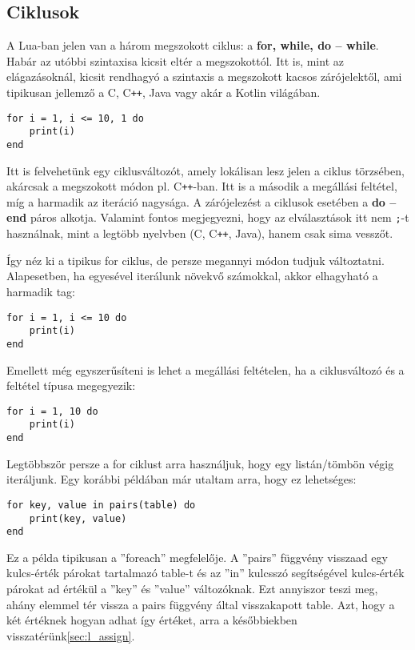 \subsection{Ciklusok}
\label{subsec:l_loop}

A Lua-ban jelen van a három megszokott ciklus: a \textbf{for, while, do -- while}. Habár az utóbbi szintaxisa kicsit eltér a megszokottól. Itt is, mint az elágazásoknál, kicsit rendhagyó a szintaxis a megszokott kacsos zárójelektől, ami tipikusan jellemző a C, C\verb|++|, Java vagy akár a Kotlin világában.
\scriptsize
\begin{lstlisting}
for i = 1, i <= 10, 1 do
	print(i)
end
\end{lstlisting}
\normalsize
Itt is felvehetünk egy ciklusváltozót, amely lokálisan lesz jelen a ciklus törzsében, akárcsak a megszokott módon pl. C\verb|++|-ban. Itt is a második a megállási feltétel, míg a harmadik az iteráció nagysága. A zárójelezést a ciklusok esetében a \textbf{do -- end} páros alkotja. Valamint fontos megjegyezni, hogy az elválasztások itt nem \verb|;|-t használnak, mint a legtöbb nyelvben (C, C\verb|++|, Java), hanem csak sima vesszőt.

Így néz ki a tipikus for ciklus, de persze megannyi módon tudjuk változtatni. Alapesetben, ha egyesével iterálunk növekvő számokkal, akkor elhagyható a harmadik tag:
\scriptsize
\begin{lstlisting}
for i = 1, i <= 10 do
	print(i)
end
\end{lstlisting} 
\normalsize
Emellett még egyszerűsíteni is lehet a megállási feltételen, ha a ciklusváltozó és a feltétel típusa megegyezik:
\scriptsize
\begin{lstlisting}
for i = 1, 10 do
	print(i)
end
\end{lstlisting}
\normalsize
Legtöbbször persze a for ciklust arra használjuk, hogy egy listán/tömbön végig iteráljunk. Egy korábbi példában már utaltam arra, hogy ez lehetséges:
\scriptsize
\begin{lstlisting}
for key, value in pairs(table) do
	print(key, value)
end
\end{lstlisting}
\normalsize
\newpage
Ez a példa tipikusan a ''foreach'' megfelelője. A ''pairs'' függvény visszaad egy kulcs-érték párokat tartalmazó table-t és az ''in'' kulcsszó segítségével kulcs-érték párokat ad értékül a ''key'' és ''value'' változóknak. Ezt annyiszor teszi meg, ahány elemmel tér vissza a pairs függvény által visszakapott table. Azt, hogy a két értéknek hogyan adhat így értéket, arra a későbbiekben visszatérünk\ref{sec:l_assign}.

